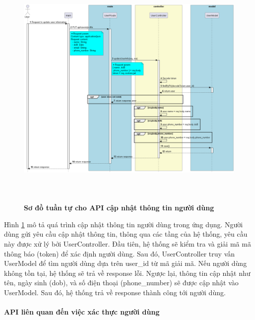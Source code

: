 \begin{figure}[H]
  \centering
  \includegraphics[width=16cm,height=12cm]{Images/server/sequence/server/updateUserInfo.png}
  \caption[Sơ đồ tuần tự cho API cập nhật thông tin người dùng ]{\bfseries \fontsize{12pt}{0pt}
  \selectfont Sơ đồ tuần tự cho API cập nhật thông tin người dùng }
  \label{updateUserInfo} %
\end{figure}

Hình \ref{updateUserInfo} mô tả quá trình cập nhật thông tin người dùng trong ứng dụng. Người dùng gửi yêu cầu cập nhật thông tin, thông qua các tầng của hệ thống, yêu cầu này được xử lý bởi UserController. Đầu tiên, hệ thống sẽ kiểm tra và giải mã mã thông báo (token) để xác định người dùng. Sau đó, UserController truy vấn UserModel để tìm người dùng dựa trên user\_id từ mã giải mã. Nếu người dùng không tồn tại, hệ thống sẽ trả về response lỗi. Ngược lại, thông tin cập nhật như tên, ngày sinh (dob), và số điện thoại (phone\_number) sẽ được cập nhật vào UserModel. Sau đó, hệ thống trả về response thành công tới người dùng.







\paragraph{API liên quan đến việc xác thực người dùng}
\mbox{}

